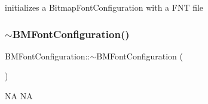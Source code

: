 initializes a Bitmap\+Font\+Configuration with a F\+NT file \mbox{\label{group__label_gad54c7b6ca83e8eaaedfff5ec431b8b11}} 
\subsubsection{\texorpdfstring{$\sim$\+B\+M\+Font\+Configuration()}{~BMFontConfiguration()}}
{\footnotesize\ttfamily B\+M\+Font\+Configuration\+::$\sim$\+B\+M\+Font\+Configuration (\begin{DoxyParamCaption}{ }\end{DoxyParamCaption})\hspace{0.3cm}{\ttfamily [virtual]}}

NA  NA 